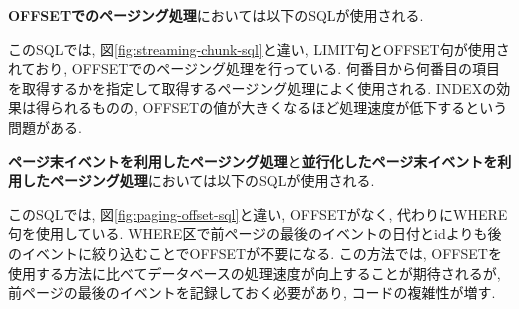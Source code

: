 \documentclass[../../../main]{subfiles}
\begin{document}
    \textbf{OFFSETでのページング処理}においては以下のSQLが使用される.

    

    このSQLでは, 図\ref{fig:streaming-chunk-sql}と違い, LIMIT句とOFFSET句が使用されており, OFFSETでのページング処理を行っている. 何番目から何番目の項目を取得するかを指定して取得するページング処理によく使用される. INDEXの効果は得られるものの, OFFSETの値が大きくなるほど処理速度が低下するという問題がある.

    \textbf{ページ末イベントを利用したページング処理}と\textbf{並行化したページ末イベントを利用したページング処理}においては以下のSQLが使用される.

    

    このSQLでは, 図\ref{fig:paging-offset-sql}と違い, OFFSETがなく, 代わりにWHERE句を使用している. WHERE区で前ページの最後のイベントの日付とidよりも後のイベントに絞り込むことでOFFSETが不要になる. この方法では, OFFSETを使用する方法に比べてデータベースの処理速度が向上することが期待されるが, 前ページの最後のイベントを記録しておく必要があり, コードの複雑性が増す.
\end{document}
